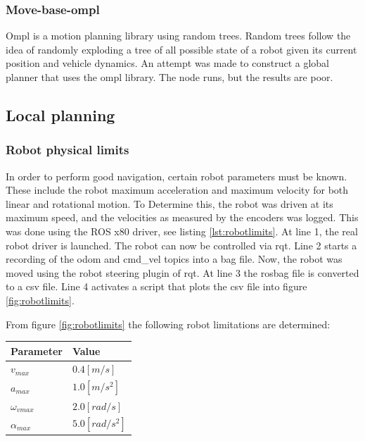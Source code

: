 \documentclass[a4paper]{article}
\begin{document}
\subsubsection{Move-base-ompl}
Ompl is a motion planning library using random trees.
Random trees follow the idea of randomly exploding a tree of all possible state of a robot
given its current position and vehicle dynamics.
An attempt was made to construct a global planner that uses the ompl library.
The node runs, but the results are poor.

\cite{globalompl}
\cite{ompl}

\subsection{Local planning}

\subsubsection{Robot physical limits}
In order to perform good navigation, certain robot parameters must be known. These include the
robot maximum acceleration and maximum velocity for both linear and rotational motion. To
Determine this, the robot was driven at its maximum speed, and the velocities as measured by
the encoders was logged. This was done using the ROS x80 driver, see listing \ref{lst:robotlimits}.
At line 1, the real robot driver is launched. The robot can now be controlled via rqt.
Line 2 starts a recording of the odom and cmd\_vel topics into a bag file. Now, the robot
was moved using the robot steering plugin of rqt. At line 3 the rosbag file is converted to
a csv file. Line 4 activates a script that plots the csv file into figure \ref{fig:robotlimits}.

From figure \ref{fig:robotlimits} the following robot limitations are determined:

\begin{tabular}{ | l | l | }
  \hline                       
  Parameter & Value \\
  \hline                       
  \hline                       
  $v_{max}$ & $0.4 [m/s] $ \\
  \hline                       
  $a_{max}$ & $ 1.0 [m/s^2] $\\
  \hline                       
  $\omega_{vmax}$ & $ 2.0 [rad/s] $ \\
  \hline                       
  $\alpha_{max}$ & $ 5.0 [rad/s^2] $ \\
  \hline  
\end{tabular}
\end{document}
